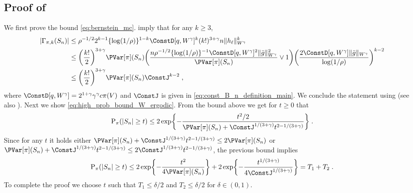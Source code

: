 \subsection{Proof of }
\label{sec:proof_bernstein_bound}
We first prove the bound \eqref{eq:bernstein_mc}.  imply that for any $k \geq 3$,
\begin{equation*}
\begin{split}
|\Gamma_{\pi, k}(S_n)|
&\leq \ratev^{-1/2} 2^{k-1}\{\log(1/\ratev)\}^{1-k} \ConstD[q,W^{\gamma}]^{k} (k!)^{3+\gamma} n \|h_\ell\|_{W^{\gamma}}^{k}  \\
&\leq \biggl(\frac{k!}{2}\biggr)^{3+\gamma}\PVar[\pi](S_n) \biggl( \frac{n \ratev^{-1/2} \{\log(1/\ratev)\}^{-1} \ConstD[q,W^{\gamma}]^{2} \|\bar{g}\|_{W^{\gamma}}^{2}}{\PVar[\pi](S_n)} \vee 1\biggr) \biggl( \frac{2 \ConstD[q,W^{\gamma}] \|\bar{g}\|_{W^{\gamma}}}{\log(1/\ratev)} \biggr)^{k-2} \\
&\leq \biggl(\frac{k!}{2}\biggr)^{3+\gamma}\PVar[\pi](S_n) \ConstJ^{k-2} \eqsp,
\end{split}
\end{equation*}
where $\ConstD[q,W^{\gamma}] = 2^{1+\gamma}\gamma^{\gamma}\cmconstv\pi(V)$ and $\ConstJ$ is given in \eqref{eq:const_B_n_definition_main}. We conclude the statement using \cite[Lemma~2.1]{bentkus:1980} (see also \cite[Equation~(24)]{doukhan2007probability}). Next we show \eqref{eq:high_prob_bound_W_ergodic}. From the bound above we get for $t \geq 0$ that
\begin{equation*}
\PP_{\pi}(|S_n| \geq t) \leq 2\exp\biggl\{-\frac{t^2/2}{\PVar[\pi](S_n) + \ConstJ^{1/(3+\gamma)} t^{2-1/(3+\gamma)}}\biggr\}\eqsp.
\end{equation*}
Since for any $t$ it holds either $\PVar[\pi](S_n) + \ConstJ^{1/(3+\gamma)} t^{2-1/(3+\gamma)} \leq 2\PVar[\pi](S_n)$ or $\PVar[\pi](S_n) + \ConstJ^{1/(3+\gamma)} t^{2-1/(3+\gamma)} \leq 2\ConstJ^{1/(3+\gamma)} t^{2-1/(3+\gamma)}$,
the previous bound implies
\begin{align*}
\PP_{\pi}(|S_n| \geq t) \leq 2\exp\biggl\{-\frac{t^2}{4\PVar[\pi](S_n)}\biggr\} + 2\exp\biggl\{-\frac{t^{1/(3+\gamma)}}{4\ConstJ^{1/(3+\gamma)}}\biggr\} = T_1 + T_2\eqsp.
\end{align*}
To complete the proof we choose $t$ such that $T_1 \leq \delta/2$ and $T_2 \leq \delta/2$ for $\delta \in (0,1)$.


